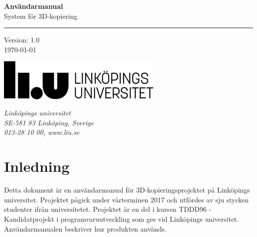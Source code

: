 \documentclass[a4paper,titlepage,12pt]{article}
\begin{document}
\begin{titlepage}

\vspace*{\fill}
\huge
\textbf{Användarmanual} \\
\Large
System för 3D-kopiering \\
\noindent\rule{17cm}{0.4pt}
\bigskip

\Large
Version: 1.0 \\
\today

\date{\today}
\vspace*{\fill}

\vspace*{\fill}
\begin{minipage}[b]{0.7\textwidth}
	\includegraphics[width=8cm]{images/liu-logga.png}
\end{minipage}
\begin{minipage}[b]{0.4\textwidth}
	\normalsize
	\textit{Linköpings universitet} \\
	\textit{SE-581 83 Linköping, Sverige}\\
	\textit{013-28 10 00, www.liu.se}
\end{minipage}

\end{titlepage}
\newpage
\begin{center}

\tableofcontents
\newpage

\end{center}

\section{Inledning}
	Detta dokument är en användarmanual för 3D-kopieringsprojektet på Linköpings universitet. Projektet pågick under vårterminen 2017 och utfördes av sju stycken studenter ifrån universitetet. Projektet är en del i kursen TDDD96 - Kandidatprojekt i programvaruutveckling som ges vid Linköpings universitet. Användarmanualen beskriver hur produkten används.
	
\end{document}
